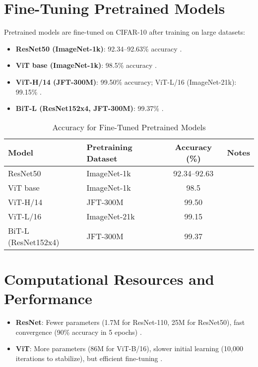 \documentclass[UTF8]{report}
\theoremstyle{MyLineTheoremStyle} %
\theoremstyle{MyBlockTheoremStyle} %
\theoremstyle{MySubsubsectionStyle} %
\begin{document}
\section*{Fine-Tuning Pretrained Models}
Pretrained models are fine-tuned on CIFAR-10 after training on large datasets:
\begin{itemize}
    \item \textbf{ResNet50 (ImageNet-1k)}: 92.34–92.63\% accuracy \cite{sidthoviti}.
    \item \textbf{ViT base (ImageNet-1k)}: 98.5\% accuracy \cite{kentaroy47vit}.
    \item \textbf{ViT-H/14 (JFT-300M)}: 99.50\% accuracy; ViT-L/16 (ImageNet-21k): 99.15\% \cite{dosovitskiy2020image}.
    \item \textbf{BiT-L (ResNet152x4, JFT-300M)}: 99.37\% \cite{dosovitskiy2020image}.
\end{itemize}

\begin{table}[h]
\centering
\caption{Accuracy for Fine-Tuned Pretrained Models}
\begin{tabular}{llcc}
\toprule
Model & Pretraining Dataset & Accuracy (\%) & Notes \\
\midrule
ResNet50 & ImageNet-1k & 92.34–92.63 & \cite{sidthoviti} \\
ViT base & ImageNet-1k & 98.5 & \cite{kentaroy47vit} \\
ViT-H/14 & JFT-300M & 99.50 & \cite{dosovitskiy2020image} \\
ViT-L/16 & ImageNet-21k & 99.15 & \cite{dosovitskiy2020image} \\
BiT-L (ResNet152x4) & JFT-300M & 99.37 & \cite{dosovitskiy2020image} \\
\bottomrule
\end{tabular}
\end{table}

\section*{Computational Resources and Performance}
\begin{itemize}
    \item \textbf{ResNet}: Fewer parameters (1.7M for ResNet-110, 25M for ResNet50), fast convergence (90\% accuracy in 5 epochs) \cite{pytorchforum}.
    \item \textbf{ViT}: More parameters (86M for ViT-B/16), slower initial learning (10,000 iterations to stabilize), but efficient fine-tuning \cite{lightningvit, dosovitskiy2020image}.
\end{itemize}
\end{document}
